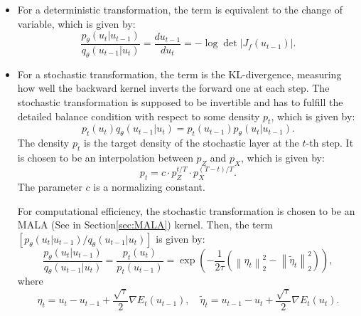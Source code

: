 \begin{itemize}
    \item For a deterministic transformation, the term is equivalent to the change of variable, which is given by:
    \begin{equation}
        \frac{p_\theta(u_{t}|u_{t-1})}{q_\theta(u_{t-1}|u_{t})} = \frac{du_{t-1}}{du_{t}} = -\log \det \left|J_f(u_{t-1})\right|.
    \end{equation}
    \item For a stochastic transformation, the term is the KL-divergence, measuring how well the backward kernel inverts the forward one at each step. The stochastic transformation is supposed to be invertible and has to fulfill the detailed balance condition with respect to some density $p_t$, which is given by:
    \begin{equation}
        p_t(u_t)q_\theta(u_{t-1}|u_t) = p_{t}(u_{t-1})p_\theta(u_t|u_{t-1}).
    \end{equation}
    The density $p_t$ is the target density of the stochastic layer at the $t$-th step. It is chosen to be an interpolation between $p_Z$ and $p_X$, which is given by:
    \begin{equation}
        p_t = c \cdot p_Z^{t/T} \cdot p_X^{(T-t)/T}.
    \end{equation}
    The parameter $c$ is a normalizing constant.

    For computational efficiency, the stochastic transformation is chosen to be an \ac{MALA} (See in Section\ref{sec:MALA}) kernel. Then, the term $\left[p_\theta(u_{t}|u_{t-1})/q_\theta(u_{t-1}|u_{t})\right]$ is given by:
    \begin{equation}
        \frac{p_\theta(u_{t}|u_{t-1})}{q_\theta(u_{t-1}|u_{t})} = \frac{p_t(u_{t})}{p_t(u_{t-1})} = \exp\left(-\frac{1}{2\tau}(\left\|\eta_t\right\|^2_2-\left\|\tilde{\eta}_t\right\|^2_2)\right),
    \end{equation}
    where 
    \begin{equation}
        \eta_t = u_t-u_{t-1}+\frac{\sqrt{\tau}}{2}\nabla E_t(u_{t-1}), \quad \tilde{\eta}_t = u_{t-1} -u_t+\frac{\sqrt{\tau}}{2}\nabla E_t(u_{t}).
    \end{equation}
\end{itemize}




